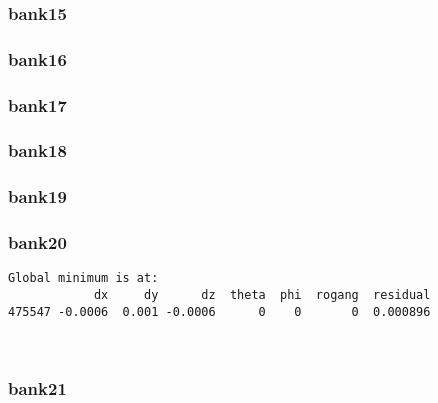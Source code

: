 \documentclass[11pt]{article}
\begin{document}
    \hypertarget{bank15}{%
\subsubsection{bank15}\label{bank15}}

    \hypertarget{bank16}{%
\subsubsection{bank16}\label{bank16}}

    \hypertarget{bank17}{%
\subsubsection{bank17}\label{bank17}}

    \hypertarget{bank18}{%
\subsubsection{bank18}\label{bank18}}

    \hypertarget{bank19}{%
\subsubsection{bank19}\label{bank19}}

    \hypertarget{bank20}{%
\subsubsection{bank20}\label{bank20}}

    \begin{Verbatim}[commandchars=\\\{\}]
Global minimum is at:
            dx     dy      dz  theta  phi  rogang  residual
475547 -0.0006  0.001 -0.0006      0    0       0  0.000896
    \end{Verbatim}

    \begin{center}
    \end{center}
    { \hspace*{\fill} \\}
    
    \hypertarget{bank21}{%
\subsubsection{bank21}\label{bank21}}
\end{document}
